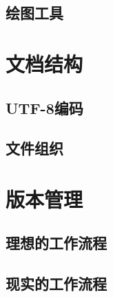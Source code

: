 \subsection{绘图工具}

\section{文档结构}
\subsection{UTF-8编码}
\subsection{ 文件组织}

\section{版本管理}
\subsection{理想的工作流程}
\subsection{现实的工作流程}

